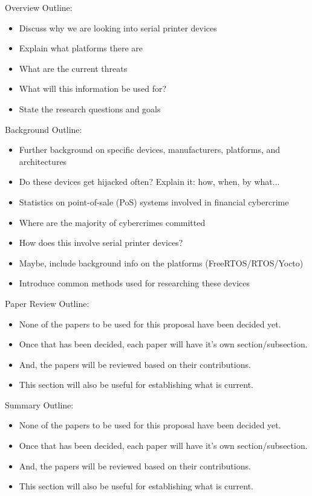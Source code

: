 

Overview Outline:
\begin{itemize}
  \item Discuss why we are looking into serial printer devices
  \item Explain what platforms there are
  \item What are the current threats
  \item What will this information be used for?
  \item State the research questions and goals
\end{itemize}

Background Outline:
\begin{itemize}
  \item Further background on specific devices, manufacturers, platforms, and architectures
  \item Do these devices get hijacked often? Explain it: how, when, by what...
  \item Statistics on point-of-sale (PoS) systems involved in financial cybercrime
  \item Where are the majority of cybercrimes committed
  \item How does this involve serial printer devices?
  \item Maybe, include background info on the platforms (FreeRTOS/RTOS/Yocto)
  \item Introduce common methods used for researching these devices
\end{itemize}


Paper Review Outline:
\begin{itemize}
  \item None of the papers to be used for this proposal have been decided yet.
  \item Once that has been decided, each paper will have it's own section/subsection.
  \item And, the papers will be reviewed based on their contributions.
  \item This section will also be useful for establishing what is current.
\end{itemize}

Summary Outline:
\begin{itemize}
  \item None of the papers to be used for this proposal have been decided yet.
  \item Once that has been decided, each paper will have it's own section/subsection.
  \item And, the papers will be reviewed based on their contributions.
  \item This section will also be useful for establishing what is current.
\end{itemize}

